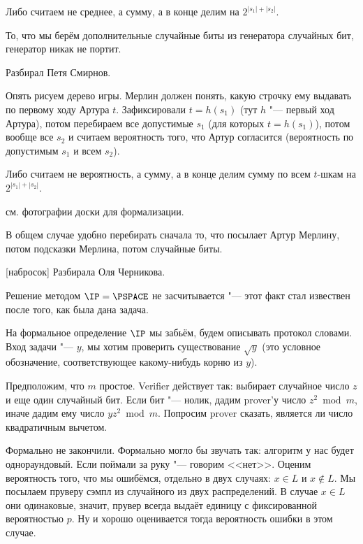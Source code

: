 	Либо считаем не среднее, а сумму, а в конце делим на $2^{|s_1|+|s_2|}$.

	\begin{Rem}
		То, что мы берём дополнительные случайные биты из генератора случайных бит, генератор никак не портит.
	\end{Rem}

	Разбирал Петя Смирнов.

	Опять рисуем дерево игры.
	Мерлин должен понять, какую строчку ему выдавать по первому ходу Артура $t$.
	Зафиксировали $t=h(s_1)$ (тут $h$ "--- первый ход Артура), потом перебираем
	все допустимые $s_1$ (для которых $t=h(s_1)$), потом вообще все $s_2$ и считаем вероятность того,
	что Артур согласится (вероятность по допустимым $s_1$ и всем $s_2$).

	Либо считаем не вероятность, а сумму, а в конце делим сумму по всем $t$-шкам на $2^{|s_1|+|s_2|}$.

	\TODO см. фотографии доски для формализации.

	\begin{Rem}
		В общем случае удобно перебирать сначала то, что посылает Артур Мерлину, потом
		подсказки Мерлина, потом случайные биты.
	\end{Rem}

[набросок]
	Разбирала Оля Черникова.

	\begin{Rem}
		Решение методом $\IP=\PSPACE$ не засчитывается "--- этот факт стал извествен после того, как была дана задача.
	\end{Rem}

	На формальное определение $\IP$ мы забьём, будем описывать протокол словами.
	Вход задачи "--- $y$, мы хотим проверить существование $\sqrt y$ (это условное обозначение,
	соответствующее какому-нибудь корню из $y$).

	Предположим, что $m$ простое.
	Verifier действует так: выбирает случайное число $z$ и еще один случайный бит.
	Если бит "--- нолик, дадим prover'у число $z^2 \bmod m$, иначе дадим ему число $yz^2 \bmod m$.
	Попросим prover сказать, является ли число квадратичным вычетом.

	Формально не закончили.
	Формально могло бы звучать так: алгоритм у нас будет однораундовый.
	Если поймали за руку "--- говорим <<нет>>.
	Оценим вероятность того, что мы ошибёмся, отдельно в двух случаях: $x \in L$ и $x \notin L$.
	Мы посылаем пруверу сэмпл из случайного из двух распределений.
	В случае $x \in L$ они одинаковые, значит, прувер всегда выдаёт единицу с фиксированной вероятностью $p$.
	Ну и хорошо оценивается тогда вероятность ошибки в этом случае.
